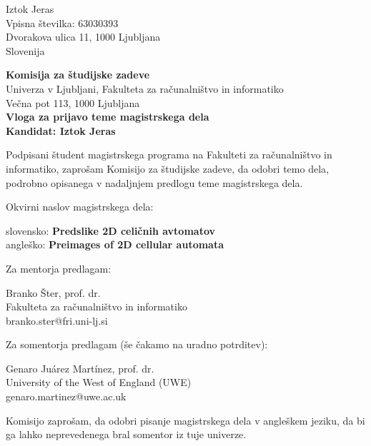 \documentclass[a4paper, 12pt]{article}
\begin{document}
\noindent
Iztok Jeras\\
Vpisna številka: 63030393\\
Dvorakova ulica 11, 1000 Ljubljana\\
Slovenija


\bigskip

{\bf Komisija za študijske zadeve}\\
Univerza v Ljubljani, Fakulteta za računalništvo in informatiko\\
Večna pot 113, 1000 Ljubljana\\

{\Large\bf
{\centering
    Vloga za prijavo teme magistrskega dela \\%
\large Kandidat: Iztok Jeras \\[10mm]}}


Podpisani študent magistrskega programa na Fakulteti za računalništvo in informatiko,
zaprošam Komisijo za študijske zadeve, da odobri temo dela, podrobno opisanega v nadaljnjem predlogu teme magistrskega dela.

Okvirni naslov magistrskega dela:

\hfill\begin{minipage}{\dimexpr\textwidth-2cm}
slovensko: {\bf Predslike 2D celičnih avtomatov}\\
angleško: {\bf Preimages of 2D cellular automata}
\end{minipage}

Za mentorja predlagam:

\hfill\begin{minipage}{\dimexpr\textwidth-2cm}
Branko Šter, prof. dr. \\
Fakulteta za računalništvo in informatiko \\
branko.ster@fri.uni-lj.si
\end{minipage}

Za somentorja predlagam (še čakamo na uradno potrditev):

\hfill\begin{minipage}{\dimexpr\textwidth-2cm}
Genaro Juárez Martínez, prof. dr. \\
University of the West of England (UWE) \\
genaro.martinez@uwe.ac.uk \\
\end{minipage}

Komisijo zaprošam, da odobri pisanje magistrskega dela v angleškem jeziku, da bi ga lahko neprevedenega bral somentor iz tuje univerze.
\end{document}
